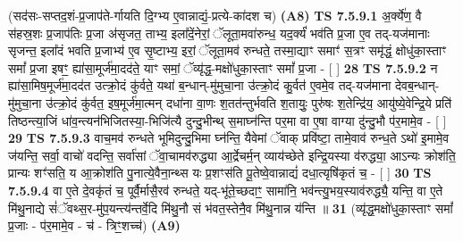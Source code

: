 \documentclass[17pt]{extarticle}
\begin{document}
                  \newline
                      (सद॑सः-सप्तद॒शं-प्र॒जाप॑ते-र्गायति दि॒ग्भ्य ए॒वान्नाद्यं॒-प्रत्ये-का॑दश च)  \textbf{(A8)} \newline \newline
                                        \textbf{ TS 7.5.9.1} \newline
                  अ॒र्क्ये॑ण॒ वै स॑हस्र॒शः प्र॒जाप॑तिः प्र॒जा अ॑सृजत॒ ताभ्य॒ इला᳚दें॒नेरां॒ ॅलूता॒मवा॑रुन्ध॒ यद॒र्क्यं॑ भव॑ति प्र॒जा ए॒व तद्-यज॑मानाः सृजन्त॒ इला᳚दं भवति प्र॒जाभ्य॑ ए॒व सृ॒ष्टाभ्य॒ इरां॒ ॅलूता॒मव॑ रुन्धते॒ तस्मा॒द्याꣳ समाꣳ॑ स॒त्रꣳ समृ॑द्धं॒ क्षोधु॑का॒स्ताꣳ समां᳚ प्र॒जा इषꣳ॒॒ ह्या॑सा॒मूर्ज॑मा॒दद॑ते॒ याꣳ समां॒ ॅव्यृ॑द्ध॒-मक्षो॑धुका॒स्ताꣳ समां᳚ प्र॒जा - [  ] \textbf{  28} \newline
                  \newline
                                \textbf{ TS 7.5.9.2} \newline
                  न ह्या॑सा॒मिष॒मूर्ज॑मा॒दद॑त उत्क्रो॒दं कु॑र्वते॒ यथा॑ ब॒न्धान्-मु॑मुचा॒ना उ॑त्क्रो॒दं कु॒र्वत॑ ए॒वमे॒व तद्-यज॑माना देवब॒न्धान्-मु॑मुचा॒ना उ॑त्क्रो॒दं कु॑र्वत॒ इष॒मूर्ज॑मा॒त्मन् दधा॑ना वा॒णः श॒तत॑न्तुर्भवति श॒तायुः॒ पुरु॑षः श॒तेन्द्रि॑य॒ आयु॑ष्ये॒वेन्द्रि॒ये प्रति॑ तिष्ठन्त्या॒जिं धा॑व॒न्त्यन॑भिजितस्या॒-भिजि॑त्यै दुन्दु॒भीन्थ् स॒माघ्न॑न्ति पर॒मा वा ए॒षा वाग्या दु॑न्दु॒भौ प॑र॒मामे॒व - [  ] \textbf{  29} \newline
                  \newline
                                \textbf{ TS 7.5.9.3} \newline
                  वाच॒मव॑ रुन्धते भूमिदुन्दु॒भिमा घ्न॑न्ति॒ यैवेमां ॅवाक् प्रवि॑ष्टा॒ तामे॒वाव॑ रुन्ध॒ते ऽथो॑ इ॒मामे॒व ज॑यन्ति॒ सर्वा॒ वाचो॑ वदन्ति॒ सर्वा॑सां ॅवा॒चामव॑रुद्ध्या आ॒र्द्रेचर्म॒न् व्याय॑च्छेते इन्द्रि॒यस्या व॑रुद्ध्या॒ आऽन्यः क्रोश॑ति॒ प्रान्यः शꣳ॑सति॒ य आ॒क्रोश॑ति पु॒नात्ये॒वैना॒न्थ्स यः प्र॒शꣳस॑ति पू॒तेष्वे॒वान्नाद्यं॑ दधा॒त्यृषि॑कृतं च॒ - [  ] \textbf{  30} \newline
                  \newline
                                \textbf{ TS 7.5.9.4} \newline
                  वा ए॒ते दे॒वकृ॑तं च॒ पूर्वै॒र्मासै॒रव॑ रुन्धते॒ यद्-भू॑ते॒च्छदाꣳ॒॒ सामा॑नि॒ भव॑न्त्यु॒भय॒स्याव॑रुद्ध्यै॒ यन्ति॒ वा ए॒ते मि॑थु॒नाद्ये सं॑ॅवथ्स॒र-मु॑प॒यन्त्य॑न्तर्वे॒दि मि॑थु॒नौ सं भ॑वत॒स्तेनै॒व मि॑थु॒नान्न य॑न्ति ॥ \textbf{  31} \newline
                  \newline
                      (व्यृ॑द्ध॒मक्षो॑धुका॒स्ताꣳ समां᳚ प्र॒जाः - प॑र॒मामे॒व - च॑ - त्रिꣳ॒॒शच्च॑)  \textbf{(A9)} \newline \newline
\end{document}
